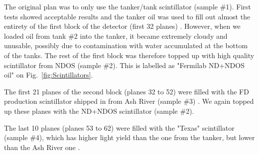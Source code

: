 The original plan \cite{NOvA-doc-34196} was to only use the tanker/tank scintillator (sample \#1). First tests showed acceptable results and the tanker oil was used to fill out almost the entirety of the first block of the detector (first 32 planes) \cite{NOvA-doc-38349}. However, when we loaded oil from tank \#2 into the tanker, it became extremely cloudy and unusable, possibly due to contamination with water accumulated at the bottom of the tanks. The rest of the first block was therefore topped up with high quality scintillator from \gls{NDOS} (sample \#2). This is labelled as "\gls{Fermilab} \gls{ND}+\gls{NDOS} oil" on Fig.~\ref{fig:Scintillators}.





The first 21 planes of the second block (planes 32 to 52) were filled with the \gls{FD} production scintillator shipped in from Ash River (sample \#3) \cite{NOvA-doc-41961}. We again topped up these planes with the \gls{ND}+\gls{NDOS} scintillator (sample \#2).

The last 10 planes (planes 53 to 62) \cite{NOvA-doc-41961} were filled with the "Texas" scintillator (sample \#4), which has higher light yield than the one from the tanker, but lower than the Ash River one \cite{NOvA-doc-38740}.


